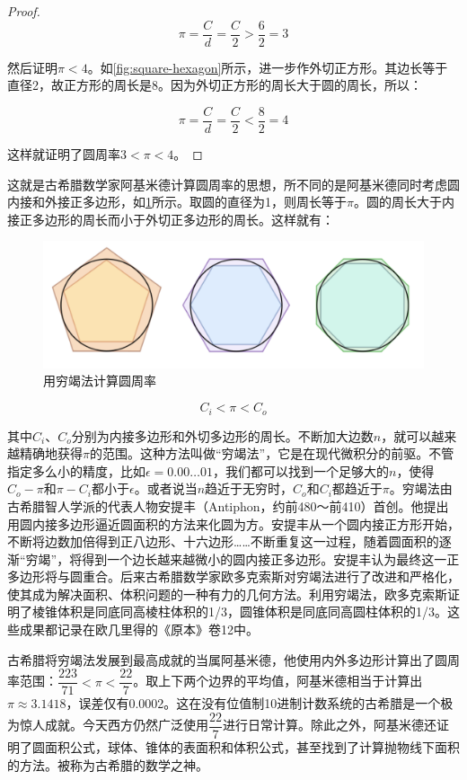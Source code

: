 \documentclass[b5paper]{ctexart}
\begin{document}
\begin{proof}
\[
\pi = \frac{C}{d} = \frac{C}{2} > \frac{6}{2} = 3
\]

然后证明$\pi < 4$。如\cref{fig:square-hexagon}所示，进一步作外切正方形。其边长等于直径2，故正方形的周长是8。因为外切正方形的周长大于圆的周长，所以：

\[
\pi = \frac{C}{d} = \frac{C}{2} < \frac{8}{2} = 4
\]

这样就证明了圆周率$3 < \pi < 4$。
\end{proof}

这就是古希腊数学家阿基米德计算圆周率的思想，所不同的是阿基米德同时考虑圆内接和外接正多边形，如\cref{fig:pi-exhaustion}所示。取圆的直径为1，则周长等于$\pi$。圆的周长大于内接正多边形的周长而小于外切正多边形的周长。这样就有：

\begin{figure}[htbp]
 \centering
 \includegraphics[scale=0.5]{img/pi-exhaustion}
 \caption{用穷竭法计算圆周率}
 \label{fig:pi-exhaustion}
\end{figure}

\[
  C_i < \pi < C_o
\]

其中$C_i$、$C_o$分别为内接多边形和外切多边形的周长。不断加大边数$n$，就可以越来越精确地获得$\pi$的范围。这种方法叫做“穷竭法”，它是在现代微积分的前驱。不管指定多么小的精度，比如$\epsilon = 0.00 \dotso 01$，我们都可以找到一个足够大的$n$，使得$C_o - \pi$和$\pi - C_i$都小于$\epsilon$。或者说当$n$趋近于无穷时，$C_o$和$C_i$都趋近于$\pi$。穷竭法由古希腊智人学派的代表人物安提丰（Antiphon，约前480～前410）首创。他提出用圆内接多边形逼近圆面积的方法来化圆为方。安提丰从一个圆内接正方形开始，不断将边数加倍得到正八边形、十六边形……不断重复这一过程，随着圆面积的逐渐“穷竭”，将得到一个边长越来越微小的圆内接正多边形。安提丰认为最终这一正多边形将与圆重合。后来古希腊数学家欧多克索斯对穷竭法进行了改进和严格化，使其成为解决面积、体积问题的一种有力的几何方法。利用穷竭法，欧多克索斯证明了棱锥体积是同底同高棱柱体积的1/3，圆锥体积是同底同高圆柱体积的1/3。这些成果都记录在欧几里得的《原本》卷12中\cite{HanXueTao16}。

古希腊将穷竭法发展到最高成就的当属阿基米德，他使用内外多边形计算出了圆周率范围：$\dfrac{223}{71} < \pi < \dfrac{22}{7}$。取上下两个边界的平均值，阿基米德相当于计算出$\pi \approx 3.1418$，误差仅有0.0002。这在没有位值制10进制计数系统的古希腊是一个极为惊人成就。今天西方仍然广泛使用$\dfrac{22}{7}$进行日常计算。除此之外，阿基米德还证明了圆面积公式，球体、锥体的表面积和体积公式，甚至找到了计算抛物线下面积的方法。被称为古希腊的数学之神。
\end{document}
